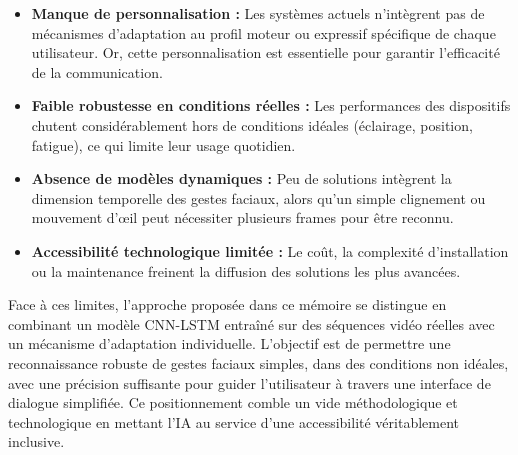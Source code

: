 \documentclass[
]{article}
\begin{document}
\begin{itemize}
\item
  \textbf{Manque de personnalisation :} Les systèmes actuels n'intègrent pas de mécanismes d'adaptation au profil moteur ou expressif spécifique de chaque utilisateur. Or, cette personnalisation est essentielle pour garantir l'efficacité de la communication.
\item
  \textbf{Faible robustesse en conditions réelles :} Les performances des dispositifs chutent considérablement hors de conditions idéales (éclairage, position, fatigue), ce qui limite leur usage quotidien.
\item
  \textbf{Absence de modèles dynamiques :} Peu de solutions intègrent la dimension temporelle des gestes faciaux, alors qu'un simple clignement ou mouvement d'œil peut nécessiter plusieurs frames pour être reconnu.
\item
  \textbf{Accessibilité technologique limitée :} Le coût, la complexité d'installation ou la maintenance freinent la diffusion des solutions les plus avancées.
\end{itemize}

Face à ces limites, l'approche proposée dans ce mémoire se distingue en combinant un modèle CNN-LSTM entraîné sur des séquences vidéo réelles avec un mécanisme d'adaptation individuelle. L'objectif est de permettre une reconnaissance robuste de gestes faciaux simples, dans des conditions non idéales, avec une précision suffisante pour guider l'utilisateur à travers une interface de dialogue simplifiée. Ce positionnement comble un vide méthodologique et technologique en mettant l'IA au service d'une accessibilité véritablement inclusive.

\hypertarget{section-44}{%
\subsection{}\label{section-44}}

\hypertarget{section-45}{%
\subsection{}\label{section-45}}

\hypertarget{section-46}{%
\subsection{}\label{section-46}}

\hypertarget{section-47}{%
\subsection{}\label{section-47}}
\end{document}
